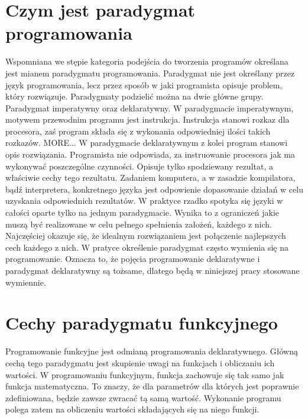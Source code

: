 \documentclass[a4paper,10pt]{report}
\begin{document}
\section{Czym jest paradygmat programowania}
Wspomniana we stępie kategoria podejścia do tworzenia programów określana jest mianem paradygmatu programowania. Paradygmat nie jest określany przez język programowania, lecz przez sposób w jaki programista opisuje problem, który rozwiązuje. Paradygmaty podzielić można na dwie główne grupy. Paradygmat imperatywny oraz deklaratywny. W paradygmacie imperatywnym, motywem przewodnim programu jest instrukcja. Instrukcja stanowi rozkaz dla procesora, zaś program składa się z wykonania odpowiedniej ilości takich rozkazów. MORE... W paradygmacie deklaratywnym z kolei program stanowi opis rozwiązania. Programista nie odpowiada, za instruowanie procesora jak ma wykonywać poszczególne czynności. Opisuje tylko spodziewany rezultat, a właściwie cechy tego rezultatu. Zadaniem komputera, a w zasadzie kompilatora, bądź interpretera, konkretnego języka jest odpowienie dopasowanie działań w celu uzyskania odpowiednich rezultatów. W praktyce rzadko spotyka się języki w całości oparte tylko na jednym paradygmacie. Wynika to z ograniczeń jakie muszą być realizowane w celu pełnego spełnienia założeń, każdego z nich. Najczęściej okazuje się, że idealnym rozwiązaniem jest połączenie najlepszych cech każdego z nich. W pratyce określenie paradygmat często wymienia się na programowanie. Oznacza to, że pojęcia programowanie deklaratywne i paradygmat deklaratywny są tożsame, dlatego będą w niniejszej pracy stosowane wymiennie.
\section{Cechy paradygmatu funkcyjnego}
Programowanie funkcyjne jest odmianą programowania deklaratywnego. Główną cechą tego paradygmatu jest skupienie uwagi na funkcjach i obliczaniu ich wartości. W programowaniu funkcyjnym, funkcja zachowuje się tak samo jak funkcja matematyczna. To znaczy, że dla parametrów dla których jest poprawnie zdefiniowana, będzie zawsze zwracać tą samą wartość. Wykonanie programu polega zatem na obliczeniu wartości składających się na niego funkcji.
\end{document}
